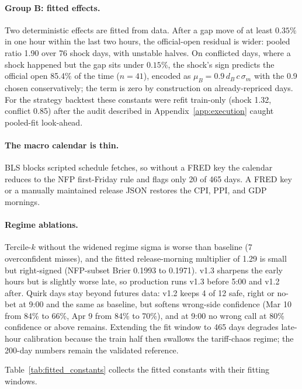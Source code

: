 \paragraph{Group B: fitted effects.}
Two deterministic effects are fitted from data. After a gap move of at
least $0.35\%$ in one hour within the last two hours, the official-open
residual is wider: pooled ratio 1.90 over 76 shock days, with unstable
halves. On conflicted days, where a shock happened but the gap sits under
$0.15\%$, the shock's sign predicts the official open 85.4\% of the
time ($n = 41$), encoded as $\mu_B = 0.9\,d_B\,c\,\sigma_m$ with the 0.9
chosen conservatively; the term is zero by construction on already-repriced
days. For the strategy backtest these constants were refit train-only
(shock 1.32, conflict 0.85) after the audit described in
Appendix~\ref{app:execution} caught pooled-fit look-ahead.

\paragraph{The macro calendar is thin.} BLS blocks scripted schedule
fetches, so without a FRED key the calendar reduces to the NFP
first-Friday rule and flags only 20 of 465 days. A FRED key or a manually
maintained release JSON restores the CPI, PPI, and GDP mornings.

\paragraph{Regime ablations.}
Tercile-$k$ without the widened regime sigma is worse than baseline (7
overconfident misses), and the fitted release-morning multiplier of 1.29 is
small but right-signed (NFP-subset Brier 0.1993 to 0.1971). v1.3 sharpens the
early hours but is slightly worse late, so production runs v1.3 before 5:00
and v1.2 after. Quirk days stay beyond futures data: v1.2 keeps 4 of 12
safe, right or no-bet at 9:00 and the same as baseline, but softens wrong-side
confidence (Mar 10 from 84\% to 66\%, Apr 9 from 84\% to 70\%), and at 9:00
no wrong call at 80\% confidence or above remains. Extending the fit window
to 465 days degrades late-hour calibration because the train half then
swallows the tariff-chaos regime; the 200-day numbers remain the validated
reference.

Table~\ref{tab:fitted_constants} collects the fitted constants with their
fitting windows.


